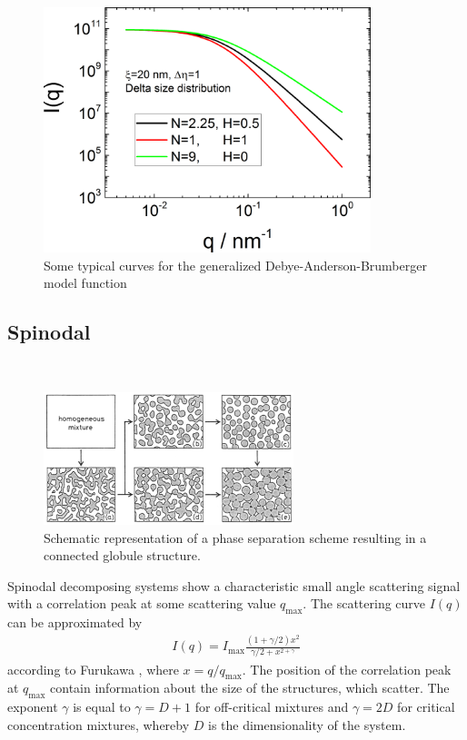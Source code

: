 \begin{figure}[htb]
\begin{center}
\includegraphics[width=0.85\textwidth]{../images/form_factor/nonparticular/gDAB.png}
\end{center}
\caption{Some typical curves for the generalized Debye-Anderson-Brumberger model function} \label{fig:gDABIq}
\end{figure}


\clearpage
\subsection{Spinodal}
\label{sect:Spinodal}
~\\

\begin{figure}[htb]
\begin{center}
\includegraphics[width=0.648\textwidth]{spinodal2.png}
\end{center}
\caption{Schematic representation of a phase separation scheme
resulting in a connected globule structure.} \label{Spinodal}
\end{figure}

Spinodal decomposing systems show a characteristic small angle
scattering signal with a correlation peak at some scattering value
$q_\text{max}$. The scattering curve $I(q)$ can be approximated by
\begin{align}
I(q) = I_\text{max} \frac{(1+\gamma/2)x^2}{\gamma/2+x^{2+\gamma}}
\end{align}
according to Furukawa \cite{Furukawa1984}, where $x=q/q_\text{max}$.
The position of the correlation peak at $q_\text{max}$ contain
information about the size of the structures, which scatter. The
exponent $\gamma$ is equal to $\gamma=D+1$ for off-critical mixtures
and $\gamma=2D$ for critical concentration mixtures, whereby $D$ is
the dimensionality of the system.

